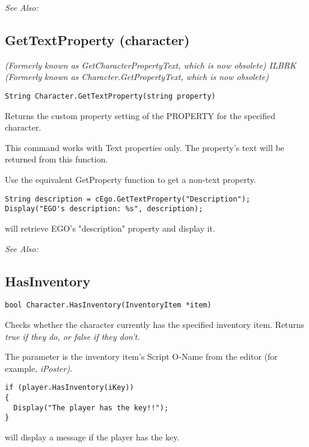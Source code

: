 \it{See Also:} 


\subsection{GetTextProperty (character)}\label{Character.GetTextProperty}%

\it{(Formerly known as GetCharacterPropertyText, which is now obsolete)} ILBRK
\it{(Formerly known as Character.GetPropertyText, which is now obsolete)}

\begin{verbatim}
String Character.GetTextProperty(string property)
\end{verbatim}
Returns the custom property setting of the PROPERTY for the specified character.

This command works with Text properties only. The property's text will be
returned from this function.

Use the equivalent GetProperty function to get a non-text property.

\begin{verbatim}
String description = cEgo.GetTextProperty("Description");
Display("EGO's description: %s", description);
\end{verbatim}
will retrieve EGO's "description" property and display it.

\it{See Also:} 


\subsection{HasInventory}\label{Character.HasInventory}%

\begin{verbatim}
bool Character.HasInventory(InventoryItem *item)
\end{verbatim}
Checks whether the character currently has the specified inventory item.
Returns \it{true} if they do, or \it{false} if they don't.

The parameter is the inventory item's Script O-Name from the editor (for
example, \it{iPoster}).

\begin{verbatim}
if (player.HasInventory(iKey))
{
  Display("The player has the key!!");
}
\end{verbatim}
will display a message if the player has the key.

